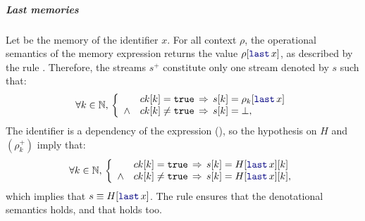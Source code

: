 \begin{skippableproof}
    \subparagraph{Last memories}
    Let  be the memory of the identifier $x$. For all context $\rho$, the operational
    semantics of the memory expression  returns the value $\rho[\last{x}]$, as described
    by the rule . Therefore, the streams
    $s^+$ constitute only one stream denoted by $s$ such that:
    \begin{equation*}
        \forall k \in \N, \,
        \left\{
        \begin{array}{ll}
                   & ck[k] = \true \, \Rightarrow \, s[k] = \rho_k[\last{x}] \\
            \wedge & ck[k] \neq \true \, \Rightarrow \,  s[k] = \bot,        \\
        \end{array}
        \right.
    \end{equation*}
    The identifier  is a dependency of the expression  (), so the hypothesis on $H$ and $(\rho_k^+)$ imply that:
    \begin{equation*}
        \forall k \in \N, \,
        \left\{
        \begin{array}{ll}
                   & ck[k] = \true \, \Rightarrow \, s[k] = H[\last{x}][k]      \\
            \wedge & ck[k] \neq \true \, \Rightarrow \,  s[k] = H[\last{x}][k], \\
        \end{array}
        \right.
    \end{equation*}
    which implies that $s \equiv H[\last{x}]$. The rule
     ensures that the denotational semantics
     holds, and that
     holds too.


\end{skippableproof}
